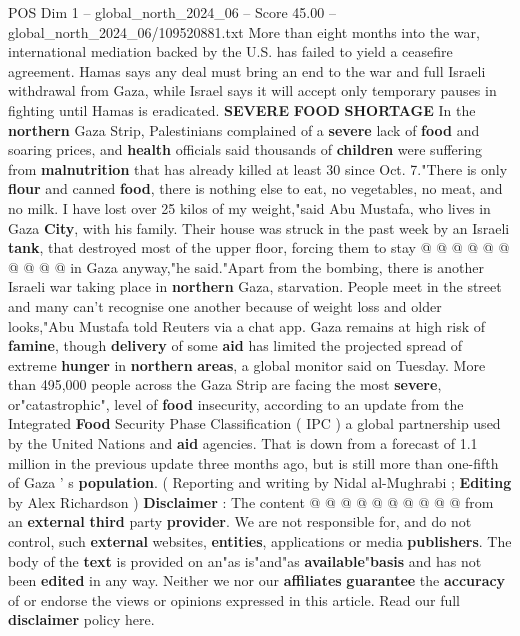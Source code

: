 \begin{textsample}{POS Dim 1 – global\_north\_2024\_06 – Score 45.00 – global\_north\_2024\_06/109520881.txt}
More than eight months into the war, international mediation backed by the U.S. has failed to yield a ceasefire agreement.
Hamas says any deal must bring an end to the war and full Israeli withdrawal from Gaza, while Israel says it will accept only temporary pauses in fighting until Hamas is eradicated. \textbf{SEVERE} \textbf{FOOD} \textbf{SHORTAGE} In the \textbf{northern} Gaza Strip, Palestinians complained of a \textbf{severe} lack of \textbf{food} and soaring prices, and \textbf{health} officials said thousands of \textbf{children} were suffering from \textbf{malnutrition} that has already killed at least 30 since Oct. 7."There is only \textbf{flour} and canned \textbf{food}, there is nothing else to eat, no vegetables, no meat, and no milk.
I have lost over 25 kilos of my weight,"said Abu Mustafa, who lives in Gaza \textbf{City}, with his family.
Their house was struck in the past week by an Israeli \textbf{tank}, that destroyed most of the upper floor, forcing them to stay @ @ @ @ @ @ @ @ @ @ in Gaza anyway,"he said."Apart from the bombing, there is another Israeli war taking place in \textbf{northern} Gaza, starvation.
People meet in the street and many can't recognise one another because of weight loss and older looks,"Abu Mustafa told Reuters via a chat app.
Gaza remains at high risk of \textbf{famine}, though \textbf{delivery} of some \textbf{aid} has limited the projected spread of extreme \textbf{hunger} in \textbf{northern} \textbf{areas}, a global monitor said on Tuesday.
More than 495,000 people across the Gaza Strip are facing the most \textbf{severe}, or"catastrophic", level of \textbf{food} insecurity, according to an update from the Integrated \textbf{Food} Security Phase Classification ( IPC ) a global partnership used by the United Nations and \textbf{aid} agencies.
That is down from a forecast of 1.1 million in the previous update three months ago, but is still more than one-fifth of Gaza ' s \textbf{population}. ( Reporting and writing by Nidal al-Mughrabi ; \textbf{Editing} by Alex Richardson ) \textbf{Disclaimer} : The content @ @ @ @ @ @ @ @ @ @ from an \textbf{external} \textbf{third} party \textbf{provider}.
We are not responsible for, and do not control, such \textbf{external} websites, \textbf{entities}, applications or media \textbf{publishers}.
The body of the \textbf{text} is provided on an"as is"and"as \textbf{available}"\textbf{basis} and has not been \textbf{edited} in any way.
Neither we nor our \textbf{affiliates} \textbf{guarantee} the \textbf{accuracy} of or endorse the views or opinions expressed in this article.
Read our full \textbf{disclaimer} policy here.

\end{textsample}
